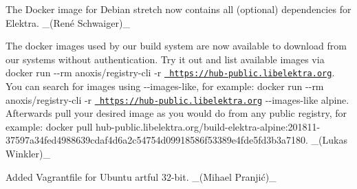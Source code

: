\begin{DoxyItemize}
\item The Docker image for Debian stretch now contains all (optional) dependencies for Elektra. \+\_\+(René Schwaiger)\+\_\+
\item The docker images used by our build system are now available to download from our systems without authentication. Try it out and list available images via {\ttfamily docker run -\/-\/rm anoxis/registry-\/cli -\/r \href{https://hub-public.libelektra.org}{\texttt{ https\+://hub-\/public.\+libelektra.\+org}}}. You can search for images using {\ttfamily -\/-\/images-\/like}, for example\+: {\ttfamily docker run -\/-\/rm anoxis/registry-\/cli -\/r \href{https://hub-public.libelektra.org}{\texttt{ https\+://hub-\/public.\+libelektra.\+org}} -\/-\/images-\/like alpine}. Afterwards pull your desired image as you would do from any public registry, for example\+: {\ttfamily docker pull hub-\/public.\+libelektra.\+org/build-\/elektra-\/alpine\+:201811-\/37597a34fed4988639cdaf4d6a2c54754d09918586f53389e4fde5fd3b3a7180}. \+\_\+(\+Lukas Winkler)\+\_\+
\end{DoxyItemize}


\begin{DoxyItemize}
\item Added Vagrantfile for Ubuntu artful 32-\/bit. \+\_\+(Mihael Pranjić)\+\_\+
\end{DoxyItemize}


